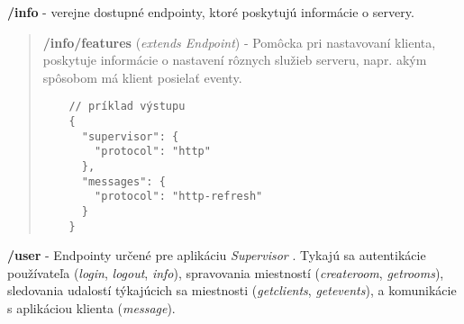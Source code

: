 \documentclass{article}
\newcommand{\filedesc}[1]{\vspace{0.3cm} \noindent \textbf{#1}}
\begin{document}
\filedesc{/info} - verejne dostupné endpointy, ktoré poskytujú informácie o servery.

\begin{quote}
  \filedesc{/info/features} (\emph{extends Endpoint}) - Pomôcka pri nastavovaní klienta, poskytuje informácie o nastavení rôznych služieb serveru, napr. akým spôsobom má klient posielať eventy.
  \begin{verbatim}
    // príklad výstupu
    {
      "supervisor": {
        "protocol": "http"
      },
      "messages": {
        "protocol": "http-refresh"
      }
    }
  \end{verbatim}
\end{quote}

\filedesc{/user} - Endpointy určené pre aplikáciu \emph{Supervisor} . Tykajú sa autentikácie používateľa (\emph{login}, \emph{logout}, \emph{info}), spravovania miestností (\emph{createroom}, \emph{getrooms}), sledovania udalostí týkajúcich sa miestnosti (\emph{getclients}, \emph{getevents}), a komunikácie s aplikáciou klienta (\emph{message}).
\end{document}
